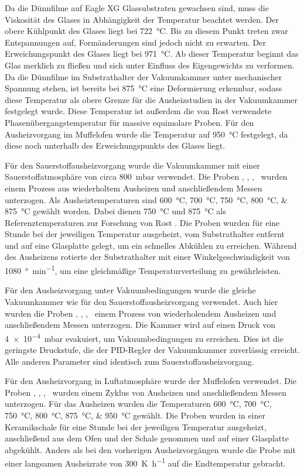 Da die Dünnfilme auf Eagle XG Glassubstraten gewachsen sind, muss die Viskosität des Glases in Abhängigkeit der
Temperatur beachtet werden.
Der obere Kühlpunkt des Glases liegt bei \qty{722}{\degreeCelsius}.
Bis zu diesem Punkt treten zwar Entspannungen auf, Formänderungen sind jedoch nicht zu erwarten.
Der Erweichungspunkt des Glases liegt bei \qty{971}{\degreeCelsius}.
Ab dieser Temperatur beginnt das Glas merklich zu fließen und sich unter Einfluss des Eigengewichts zu verformen.
Da die Dünnfilme im Substrathalter der Vakuumkammer unter mechanischer Spannung stehen, ist bereits bei
\qty{875}{\degreeCelsius} eine Deformierung erkennbar, sodass diese Temperatur als obere Grenze für die Ausheizstudien
in der Vakuumkammer festgelegt wurde.
Diese Temperatur ist außerdem die von Rost verwendete Phasenübergangstemperatur für massive equimolare Proben.
\autocite{Rost2015}
Für den Ausheizvorgang im Muffelofen wurde die Temperatur auf \qty{950}{\degreeCelsius} festgelegt, da diese noch
unterhalb des Erweichungspunkts des Glases liegt.

Für den Sauerstoffausheizvorgang wurde die Vakuumkammer mit einer Sauerstoffatmosphäre von circa \qty{800}{\milli\bar}
verwendet.
Die Proben \samplethree, \sampleone, \sampletwo, \samplefour\ wurden einem Prozess aus wiederholtem Ausheizen und
anschließendem Messen unterzogen.
Als Ausheiztemperaturen sind \qtylist{600;700;750;800;875}{\degreeCelsius} gewählt worden.
Dabei dienen \qty{750}{\degreeCelsius} und \qty{875}{\degreeCelsius} als Referenztemperaturen zur Forschung
von Rost \autocite{Rost2015}.
Die Proben wurden für eine Stunde bei der jeweiligen Temperatur ausgeheizt, vom Substrathalter entfernt und auf eine
Glasplatte gelegt, um ein schnelles Abkühlen zu erreichen.
Während des Ausheizens rotierte der Substrathalter mit einer Winkelgeschwindigkeit von
\qty{1080}{\degree\per\minute}, um eine
gleichmäßige Temperaturverteilung zu gewährleisten.

Für den Ausheizvorgang unter Vakuumbedingungen wurde die gleiche Vakuumkammer wie für den Sauerstoffausheizvorgang
verwendet.
Auch hier wurden die Proben \samplethree, \sampleone, \sampletwo, \samplefour\ einem Prozess von wiederholendem
Ausheizen und anschließendem Messen unterzogen.
Die Kammer wird auf einen Druck von \qty{4e-4}{\milli\bar} evakuiert, um Vakuumbedingungen zu erreichen.
Dies ist die geringste Druckstufe, die der PID-Regler der Vakuumkammer zuverlässig erreicht.
Alle anderen Parameter sind identisch zum Sauerstoffausheizvorgang.

Für den Ausheizvorgang in Luftatmosphäre wurde der Muffelofen verwendet.
Die Proben \samplethree, \sampleone, \sampletwo, \samplefour\ wurden einem Zyklus von Ausheizen und anschließendem
Messen unterzogen.
Für das Ausheizen wurden die Temperaturen \qtylist{600;700;750;800;875;950}{\degreeCelsius} gewählt.
Die Proben wurden in einer Keramikschale für eine Stunde bei der jeweiligen Temperatur ausgeheizt, anschließend
aus dem Ofen und der Schale genommen und auf einer Glasplatte abgekühlt.
Anders als bei den vorherigen Ausheizvorgängen wurde die Probe mit einer langsamen Ausheizrate von
\qty{300}{\kelvin\per\hour} auf die Endtemperatur gebracht.

